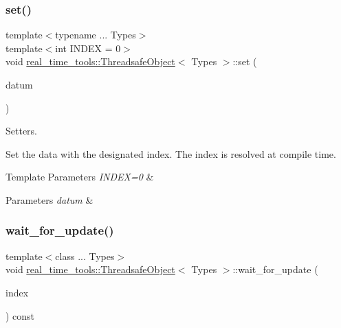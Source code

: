 \subsubsection{\texorpdfstring{set()}{set()}\hspace{0.1cm}{\footnotesize\ttfamily [2/2]}}
{\footnotesize\ttfamily template$<$typename ... Types$>$ \\
template$<$int I\+N\+D\+EX = 0$>$ \\
void \hyperlink{classreal__time__tools_1_1ThreadsafeObject}{real\+\_\+time\+\_\+tools\+::\+Threadsafe\+Object}$<$ Types $>$\+::set (\begin{DoxyParamCaption}\item[{\hyperlink{classreal__time__tools_1_1ThreadsafeObject_afcbd77df1964d4fe606f1e776f1ff9b8}{Type}$<$ I\+N\+D\+EX $>$}]{datum }\end{DoxyParamCaption})}



Setters. 

Set the data with the designated index. The index is resolved at compile time.


\begin{DoxyTemplParams}{Template Parameters}
{\em I\+N\+D\+E\+X=0} & \\
\hline
\end{DoxyTemplParams}

\begin{DoxyParams}{Parameters}
{\em datum} & \\
\hline
\end{DoxyParams}
\mbox{\label{classreal__time__tools_1_1ThreadsafeObject_a85d7f9175a08a3440f9bb783fd4aa264}} 
\subsubsection{\texorpdfstring{wait\+\_\+for\+\_\+update()}{wait\_for\_update()}\hspace{0.1cm}{\footnotesize\ttfamily [1/3]}}
{\footnotesize\ttfamily template$<$class ... Types$>$ \\
void \hyperlink{classreal__time__tools_1_1ThreadsafeObject}{real\+\_\+time\+\_\+tools\+::\+Threadsafe\+Object}$<$ Types $>$\+::wait\+\_\+for\+\_\+update (\begin{DoxyParamCaption}\item[{unsigned}]{index }\end{DoxyParamCaption}) const}



